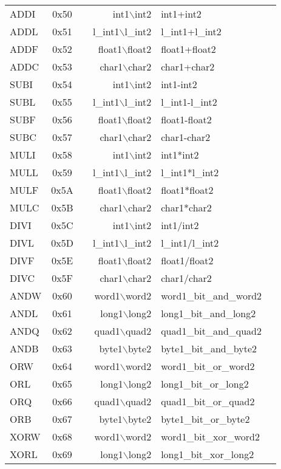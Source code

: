 \documentclass {article}
\begin{document}
\begin {tabular}{l|c|l|r@{--}l|l}
ADDI	& 0x50		& 		&int1$\backslash$int2&int1+int2\\
ADDL	& 0x51		& 		&l\_int1$\backslash$l\_int2&l\_int1+l\_int2\\
ADDF	& 0x52		& 		&float1$\backslash$float2&float1+float2\\
ADDC	& 0x53		& 		&char1$\backslash$char2&char1+char2\\
SUBI	& 0x54		& 		&int1$\backslash$int2&int1-int2\\
SUBL	& 0x55		& 		&l\_int1$\backslash$l\_int2&l\_int1-l\_int2\\
SUBF	& 0x56		& 		&float1$\backslash$float2&float1-float2\\
SUBC	& 0x57		& 		&char1$\backslash$char2&char1-char2\\
MULI	& 0x58		& 		&int1$\backslash$int2&int1*int2\\
MULL	& 0x59		& 		&l\_int1$\backslash$l\_int2&l\_int1*l\_int2\\
MULF	& 0x5A		& 		&float1$\backslash$float2&float1*float2\\
MULC	& 0x5B		& 		&char1$\backslash$char2&char1*char2\\
DIVI	& 0x5C		& 		&int1$\backslash$int2&int1/int2\\
DIVL	& 0x5D		& 		&l\_int1$\backslash$l\_int2&l\_int1/l\_int2\\
DIVF	& 0x5E		& 		&float1$\backslash$float2&float1/float2\\
DIVC	& 0x5F		& 		&char1$\backslash$char2&char1/char2\\
ANDW	& 0x60		& 		&word1$\backslash$word2&word1\_bit\_and\_word2\\
ANDL	& 0x61		& 		&long1$\backslash$long2&long1\_bit\_and\_long2\\
ANDQ	& 0x62		& 		&quad1$\backslash$quad2&quad1\_bit\_and\_quad2\\
ANDB	& 0x63		& 		&byte1$\backslash$byte2&byte1\_bit\_and\_byte2\\
ORW	& 0x64		& 		&word1$\backslash$word2&word1\_bit\_or\_word2\\
ORL	& 0x65		& 		&long1$\backslash$long2&long1\_bit\_or\_long2\\
ORQ	& 0x66		& 		&quad1$\backslash$quad2&quad1\_bit\_or\_quad2\\
ORB	& 0x67		& 		&byte1$\backslash$byte2&byte1\_bit\_or\_byte2\\
XORW	& 0x68		& 		&word1$\backslash$word2&word1\_bit\_xor\_word2\\
XORL	& 0x69		& 		&long1$\backslash$long2&long1\_bit\_xor\_long2\\

\end{tabular}
\end{document}
